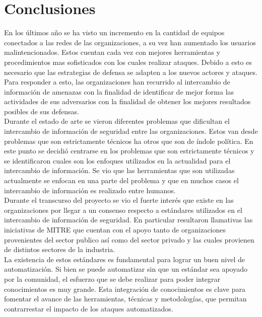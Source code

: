 \section{Conclusiones}

En los últimos año se ha visto un incremento en la cantidad de equipos conectados a las redes de las organizaciones, a su vez han aumentado los usuarios malintencionados. Estos cuentan cada vez con mejores herramientas y procedimientos mas sofisticados con los cuales realizar ataques. Debido a esto es necesario que las estrategias de defensa se adapten a los nuevos actores y ataques. Para responder a esto, las organizaciones han recurrido al intercambio de información de amenazas con la finalidad de identificar de mejor forma las actividades de sus adversarios con la finalidad de obtener los mejores resultados posibles de sus defensas.\\
\bigskip
Durante el estado de arte se vieron diferentes problemas que dificultan el intercambio de información de seguridad entre las organizaciones. Estos van desde problemas que son estrictamente técnicos ha otros que son de índole política. En este punto se decidió centrarse en los problemas que son estrictamente técnicos y se identificaron cuales son los enfoques utilizados en la actualidad para el intercambio de información. Se vio que las  herramientas que son utilizadas actualmente se enfocan en una parte del problema y que en muchos casos el intercambio de información es realizado entre humanos.  \\
\bigskip
Durante el transcurso del proyecto se vio el fuerte interés que existe en las organizaciones por llegar a un consenso respecto a estándares utilizados en el intercambio de información de seguridad.  En particular resultaron llamativas las iniciativas de MITRE que cuentan con el apoyo tanto de organizaciones provenientes del sector publico así como del sector privado y las cuales provienen de distintos sectores de la industria.\\   
\bigskip
La existencia de estos estándares es fundamental para lograr un buen nivel de automatización. Si bien se puede automatizar sin que un estándar sea apoyado por la comunidad, el esfuerzo que se debe realizar para poder integrar conocimientos es muy grande. Esta integración de conocimientos es clave para fomentar el avance de las herramientas, técnicas y metodologías, que permitan contrarrestar el impacto de los ataques automatizados.\\
\bigskip
